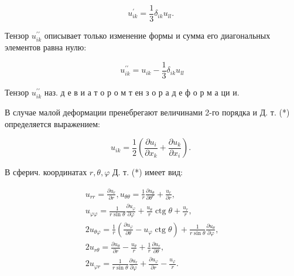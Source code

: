 \documentclass[10pt]{article}
\begin{document}
\[

u_{i k}^{\prime}=\frac{1}{3} \delta_{i k} u_{l l} \text {. }

\]



Тензор $u_{i k}^{\prime \prime}$ описывает только изменение формы и сумма его диагональных элементов равна нулю:



\[

u_{i k}^{\prime \prime}=u_{i k}-\frac{1}{3} \delta_{i k} u_{l l}

\]



Тензор $u_{i k}^{\prime \prime}$ наз. д е в и а т о р о м т ен з о р а д е ф о р м а ци и.



В случае малой деформации пренебрегают величинами 2-го порядка и Д. т. (*) определяется выражением:



\[

u_{i k}=\frac{1}{2}\left(\frac{\partial u_{i}}{\partial x_{k}}+\frac{\partial u_{k}}{\partial x_{i}}\right) \text {. }

\]



В сферич. координатах $r, \theta, \varphi$ Д. т. (*) имеет вид:



\[

\begin{gathered}

u_{r r}=\frac{\partial u_{r}}{\partial r}, u_{\theta \theta}=\frac{1}{r} \frac{\partial u_{\theta}}{\partial \theta^{r}}+\frac{u_{r}}{\partial r}, \\

u_{\varphi \varphi}=\frac{1}{r \sin \theta} \frac{\partial u_{\varphi}}{\partial \varphi}+\frac{u_{\theta}}{r} \operatorname{ctg} \theta+\frac{u_{r}}{r}, \\

2 u_{\theta \varphi}=\frac{1}{r}\left(\frac{\partial u_{\varphi}}{\partial \theta}-u_{\varphi} \operatorname{ctg} \theta\right)+\frac{1}{r \sin \theta} \frac{\partial u_{\theta}}{\partial \varphi}, \\

2 u_{r \theta}=\frac{\partial u_{\theta}}{\partial r}-\frac{u_{\theta}}{r}+\frac{1}{r} \frac{\partial u_{r}}{\partial \theta}, \\

2 u_{\varphi r}=\frac{1}{r \sin \theta} \frac{\partial u_{r}}{\partial \varphi}+\frac{\partial u_{\varphi}}{\partial r}-\frac{u_{\varphi}}{r} .

\end{gathered}

\]
\end{document}
